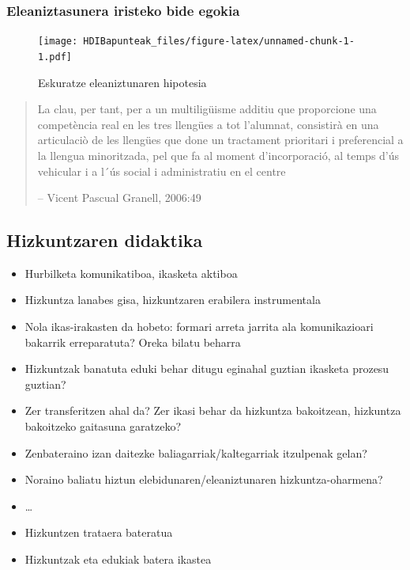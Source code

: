 \documentclass[
]{book}
\providecommand{\tightlist}{%
  \setlength{\itemsep}{0pt}\setlength{\parskip}{0pt}}
\begin{document}
\hypertarget{eleaniztasunera-iristeko-bide-egokia}{%
\subsubsection{Eleaniztasunera iristeko bide egokia}\label{eleaniztasunera-iristeko-bide-egokia}}

\begin{figure}
\centering
\texttt{[image: HDIBapunteak\_files/figure-latex/unnamed-chunk-1-1.pdf]}
\caption{\label{fig:unnamed-chunk-1}Eskuratze eleaniztunaren hipotesia}
\end{figure}

\begin{quote}
La clau, per tant, per a un multiligüisme additiu que proporcione una competència real en les tres llengües a tot l'alumnat, consistirà en una articulaciò de les llengües que done un tractament prioritari i preferencial a la llengua minoritzada, pel que fa al moment d'incorporació, al temps d'ús vehicular i a l´ús social i administratiu en el centre

-- Vicent Pascual Granell, 2006:49
\end{quote}

\hypertarget{hizkuntzaren-didaktika}{%
\subsection{Hizkuntzaren didaktika}\label{hizkuntzaren-didaktika}}

\begin{itemize}
\tightlist
\item
  Hurbilketa komunikatiboa, ikasketa aktiboa
\item
  Hizkuntza lanabes gisa, hizkuntzaren erabilera instrumentala
\item
  Nola ikas-irakasten da hobeto: formari arreta jarrita ala komunikazioari bakarrik erreparatuta? Oreka bilatu beharra
\item
  Hizkuntzak banatuta eduki behar ditugu eginahal guztian ikasketa prozesu guztian?
\item
  Zer transferitzen ahal da? Zer ikasi behar da hizkuntza bakoitzean, hizkuntza bakoitzeko gaitasuna garatzeko?
\item
  Zenbateraino izan daitezke baliagarriak/kaltegarriak itzulpenak gelan?
\item
  Noraino baliatu hiztun elebidunaren/eleaniztunaren hizkuntza-oharmena?
\item
  \ldots{}
\item
  Hizkuntzen trataera bateratua
\item
  Hizkuntzak eta edukiak batera ikastea
\end{itemize}
\end{document}
